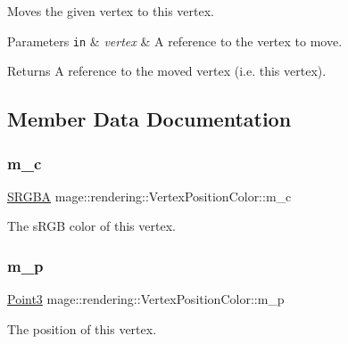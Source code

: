 Moves the given vertex to this vertex.


\begin{DoxyParams}[1]{Parameters}
\mbox{\tt in}  & {\em vertex} & A reference to the vertex to move. \\
\hline
\end{DoxyParams}
\begin{DoxyReturn}{Returns}
A reference to the moved vertex (i.\+e. this vertex). 
\end{DoxyReturn}


\subsection{Member Data Documentation}
\hypertarget{structmage_1_1rendering_1_1_vertex_position_color_ac4aa1eea0e3e24411a57670550822198}{}\label{structmage_1_1rendering_1_1_vertex_position_color_ac4aa1eea0e3e24411a57670550822198} 
\subsubsection{\texorpdfstring{m\+\_\+c}{m\_c}}
{\footnotesize\ttfamily \hyperlink{structmage_1_1_s_r_g_b_a}{S\+R\+G\+BA} mage\+::rendering\+::\+Vertex\+Position\+Color\+::m\+\_\+c}

The s\+R\+GB color of this vertex. \hypertarget{structmage_1_1rendering_1_1_vertex_position_color_a2c1c6a22bff4eca8cee086cc978d008b}{}\label{structmage_1_1rendering_1_1_vertex_position_color_a2c1c6a22bff4eca8cee086cc978d008b} 
\subsubsection{\texorpdfstring{m\+\_\+p}{m\_p}}
{\footnotesize\ttfamily \hyperlink{structmage_1_1_point3}{Point3} mage\+::rendering\+::\+Vertex\+Position\+Color\+::m\+\_\+p}

The position of this vertex. \hypertarget{structmage_1_1rendering_1_1_vertex_position_color_a0e9bd3e8e7cad0a5167aaeb76de9fbb3}{}\label{structmage_1_1rendering_1_1_vertex_position_color_a0e9bd3e8e7cad0a5167aaeb76de9fbb3} 
